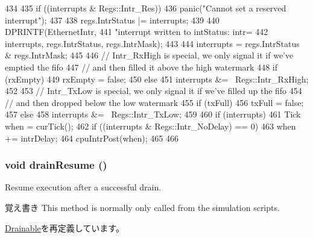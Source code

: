 \begin{DoxyCode}
434 {
435     if ((interrupts & Regs::Intr_Res))
436         panic("Cannot set a reserved interrupt");
437 
438     regs.IntrStatus |= interrupts;
439 
440     DPRINTF(EthernetIntr,
441             "interrupt written to intStatus: intr=%
442             interrupts, regs.IntrStatus, regs.IntrMask);
443 
444     interrupts = regs.IntrStatus & regs.IntrMask;
445 
446     // Intr_RxHigh is special, we only signal it if we've emptied the fifo
447     // and then filled it above the high watermark
448     if (rxEmpty)
449         rxEmpty = false;
450     else
451         interrupts &= ~Regs::Intr_RxHigh;
452 
453     // Intr_TxLow is special, we only signal it if we've filled up the fifo
454     // and then dropped below the low watermark
455     if (txFull)
456         txFull = false;
457     else
458         interrupts &= ~Regs::Intr_TxLow;
459 
460     if (interrupts) {
461         Tick when = curTick();
462         if ((interrupts & Regs::Intr_NoDelay) == 0)
463             when += intrDelay;
464         cpuIntrPost(when);
465     }
466 }
\end{DoxyCode}
\hypertarget{classSinic_1_1Device_a8f020d3237536fe007fc488c4125c5d8}{
\subsubsection[{drainResume}]{\setlength{\rightskip}{0pt plus 5cm}void drainResume ()}}
\label{classSinic_1_1Device_a8f020d3237536fe007fc488c4125c5d8}
Resume execution after a successful drain.

\begin{DoxyNote}{覚え書き}
This method is normally only called from the simulation scripts. 
\end{DoxyNote}


\hyperlink{classDrainable_a8f020d3237536fe007fc488c4125c5d8}{Drainable}を再定義しています。


